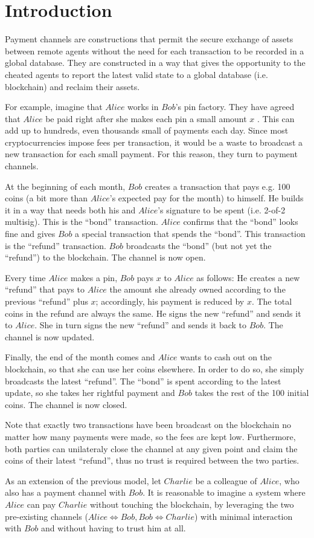 \section{Introduction}
  Payment channels are constructions that permit the secure exchange of assets between
  remote agents without the need for each transaction to be recorded in a global database.
  They are constructed in a way that gives the opportunity to the cheated agents to report
  the latest valid state to a global database (i.e. blockchain) and reclaim their assets.

  For example, imagine that $Alice$ works in $Bob$'s pin factory. They have agreed that
  $Alice$ be paid right after she makes each pin a small amount $x$ \cite{bdevguide}. This
  can add up to hundreds, even thousands small of payments each day. Since most
  cryptocurrencies impose fees per transaction, it would be a waste to broadcast a new
  transaction for each small payment. For this reason, they turn to payment channels.

  At the beginning of each month, $Bob$ creates a transaction that pays e.g. 100 coins (a
  bit more than $Alice$'s expected pay for the month) to himself. He builds it in a way
  that needs both his and $Alice$'s signature to be spent (i.e. 2-of-2 multisig). This is
  the ``bond'' transaction. $Alice$ confirms that the ``bond'' looks fine and gives $Bob$
  a special transaction that spends the ``bond''. This transaction is the ``refund''
  transaction. $Bob$ broadcasts the ``bond'' (but not yet the ``refund'') to the
  blockchain. The channel is now open.

  Every time $Alice$ makes a pin, $Bob$ pays $x$ to $Alice$ as follows: He creates a new
  ``refund'' that pays to $Alice$ the amount she already owned according to the previous
  ``refund'' plus $x$; accordingly, his payment is reduced by $x$. The total coins in
  the refund are always the same. He signs the new ``refund'' and sends it to $Alice$. She
  in turn signs the new ``refund'' and sends it back to $Bob$. The channel is now updated.

  Finally, the end of the month comes and $Alice$ wants to cash out on the blockchain, so
  that she can use her coins elsewhere. In order to do so, she simply broadcasts the
  latest ``refund''. The ``bond'' is spent according to the latest update, so she takes
  her rightful payment and $Bob$ takes the rest of the 100 initial coins. The channel is
  now closed.

  Note that exactly two transactions have been broadcast on the blockchain no matter how
  many payments were made, so the fees are kept low. Furthermore, both parties can
  unilateraly close the channel at any given point and claim the coins of their latest
  ``refund'', thus no trust is required between the two parties.

  As an extension of the previous model, let $Charlie$ be a colleague of $Alice$, who also
  has a payment channel with $Bob$. It is reasonable to imagine a system where $Alice$ can
  pay $Charlie$ without touching the blockchain, by leveraging the two pre-existing
  channels ($Alice \Leftrightarrow Bob, Bob \Leftrightarrow Charlie$) with minimal
  interaction with $Bob$ and without having to trust him at all.
